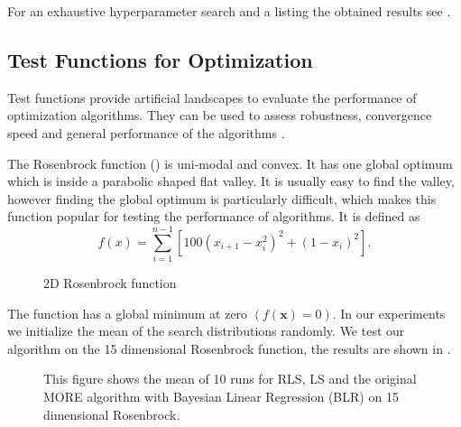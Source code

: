 For an exhaustive hyperparameter search and a listing the obtained results
see .

\subsection{Test Functions for Optimization}
\label{sec:test_func}
Test functions provide artificial landscapes to evaluate the
performance of optimization algorithms. They can be used to
assess robustness, convergence speed and general performance of the
algorithms \citep{molga2005test}.

The Rosenbrock function () is uni-modal and convex.
It has one global optimum which is inside a parabolic shaped flat valley.
It is usually easy to find the valley,
however finding the global optimum is particularly difficult,
which makes this function popular for testing the performance
of algorithms.
It is defined as 
\begin{equation*}
 f(x) = \sum^{n-1}_{i=1} [100(x_{i+1} - x_i^2)^2 + (1-x_i)^2].
\end{equation*}

\begin{figure}[ht!]
    \centering
    
    \caption{2D Rosenbrock function}
    \label{fig:rosenbrock}
\end{figure}

The function has a global minimum at zero $(f(\mathbf{x}) = 0)$.
In our experiments we initialize the mean of the search distributions
randomly. We test our algorithm on the 15 dimensional
Rosenbrock function, the results are shown in .

\begin{figure}[ht!]
     \centering
     
     \hspace{1cm}                       
     \caption{
       This figure shows the mean of 10 runs for RLS, LS and
       the original MORE algorithm with Bayesian Linear Regression (BLR)
       on 15 dimensional Rosenbrock.
     }
     \label{fig:rosen_result}  
\end{figure}


